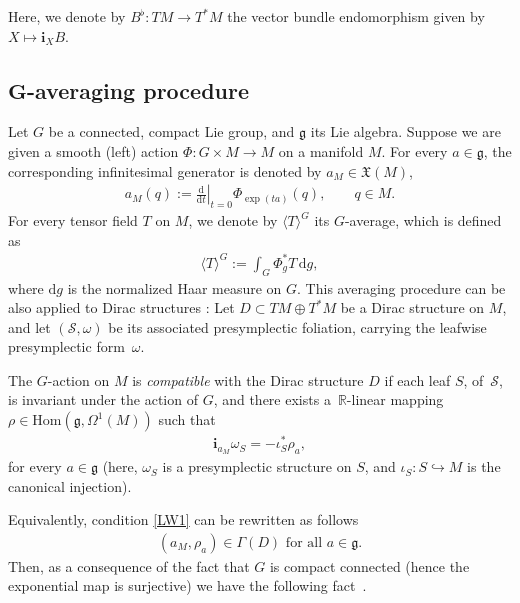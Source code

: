 \documentclass[10pt,a4paper]{amsart}
\numberwithin{equation}{section}
\begin{document}
 Here, we denote by $B^{\flat}\colon TM\to T^*M$ the vector bundle endomorphism given by $X\mapsto \mathbf{i}_XB$.

\subsection[$G$-averaging procedure]{$\boldsymbol{G}$-averaging procedure}
Let $G$ be a connected, compact Lie group, and $\mathfrak{g}$ its Lie algebra. Suppose we are given a smooth (left) action $\Phi\colon G\times M\rightarrow M$ on a manifold $M$. For every $a\in\mathfrak{g}$, the corresponding inf\/initesimal generator is denoted by $a_{M}\in\mathfrak{X}(M)$,
\begin{gather*}
a_{M}(q):=\left.\frac{\mathrm{d}}{\mathrm{d}t}\right|_{t=0}\Phi_{\exp(ta)}(q),\qquad q\in M.
\end{gather*}
For every tensor f\/ield $T$ on $M$, we denote by $ \langle T \rangle^{G}$ its $G$-average, which is def\/ined as
\begin{gather*}
 \langle T \rangle^{G}:=\int_G \Phi^{\ast}_{g}T\,\mathrm{d}g,
\end{gather*}
where $\mathrm{d}g$ is the normalized Haar measure on $G$. This averaging procedure can be also applied to Dirac structures \cite{JVYV-14}: Let $D\subset TM\oplus T^{\ast}M$ be a Dirac structure on $M$, and let $(\mathcal{S},\omega)$ be its associated presymplectic foliation, carrying the leafwise presymplectic form~$\omega$.

\begin{Definition}\label{def2.1}
The $G$-action on $M$ is \emph{compatible} with the Dirac structure $D$ if each leaf $S$, of~$\mathcal{S}$, is invariant under the action of $G$, and there exists a~$\mathbb{R}$-linear mapping $\rho\in\mathrm{Hom}(\mathfrak{g},\Omega^{1}(M))$ such that
\begin{gather}
\mathbf{i}_{a_{M}}\omega_S=-\iota^\ast_S\rho_{a}, \label{LW1}
\end{gather}
for every $a\in\mathfrak{g}$ (here, $\omega_S$ is a presymplectic structure on $S$, and $\iota_S\colon S\hookrightarrow M$ is the canonical injection).
\end{Definition}

Equivalently, condition \eqref{LW1} can be rewritten as follows
\begin{gather*}
(a_{M},\rho_{a})\in\Gamma(D)\mbox{ for all }a\in\mathfrak{g}. %
\end{gather*}
Then, as a consequence of the fact that $G$ is compact connected (hence the exponential map is surjective) we have the following fact~\cite{JVYV-14}.
\end{document}
